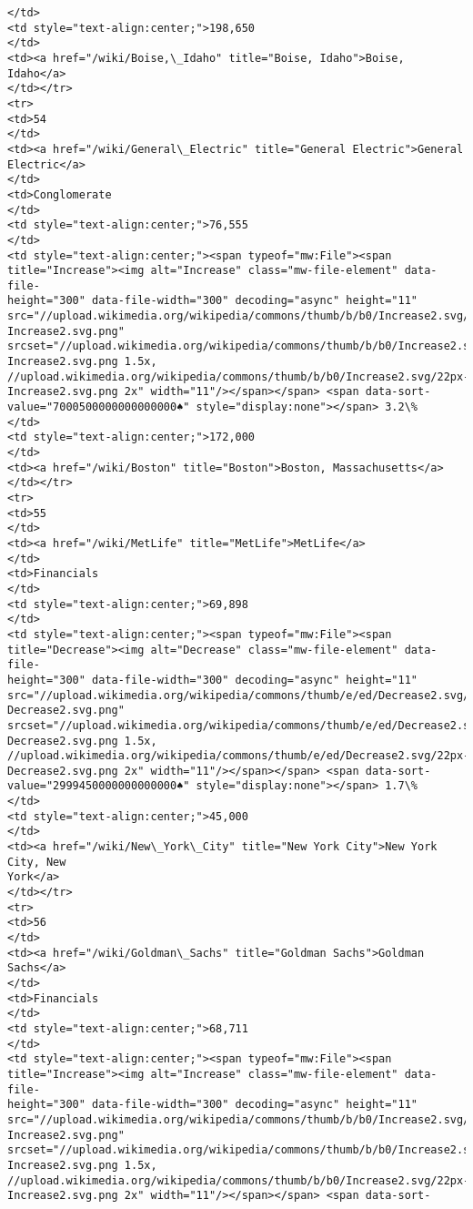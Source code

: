 \documentclass[11pt]{article}
\begin{document}
\begin{Verbatim}[commandchars=\\\{\}]
</td>
<td style="text-align:center;">198,650
</td>
<td><a href="/wiki/Boise,\_Idaho" title="Boise, Idaho">Boise, Idaho</a>
</td></tr>
<tr>
<td>54
</td>
<td><a href="/wiki/General\_Electric" title="General Electric">General
Electric</a>
</td>
<td>Conglomerate
</td>
<td style="text-align:center;">76,555
</td>
<td style="text-align:center;"><span typeof="mw:File"><span
title="Increase"><img alt="Increase" class="mw-file-element" data-file-
height="300" data-file-width="300" decoding="async" height="11"
src="//upload.wikimedia.org/wikipedia/commons/thumb/b/b0/Increase2.svg/11px-
Increase2.svg.png"
srcset="//upload.wikimedia.org/wikipedia/commons/thumb/b/b0/Increase2.svg/17px-
Increase2.svg.png 1.5x,
//upload.wikimedia.org/wikipedia/commons/thumb/b/b0/Increase2.svg/22px-
Increase2.svg.png 2x" width="11"/></span></span> <span data-sort-
value="7000500000000000000♠" style="display:none"></span> 3.2\%
</td>
<td style="text-align:center;">172,000
</td>
<td><a href="/wiki/Boston" title="Boston">Boston, Massachusetts</a>
</td></tr>
<tr>
<td>55
</td>
<td><a href="/wiki/MetLife" title="MetLife">MetLife</a>
</td>
<td>Financials
</td>
<td style="text-align:center;">69,898
</td>
<td style="text-align:center;"><span typeof="mw:File"><span
title="Decrease"><img alt="Decrease" class="mw-file-element" data-file-
height="300" data-file-width="300" decoding="async" height="11"
src="//upload.wikimedia.org/wikipedia/commons/thumb/e/ed/Decrease2.svg/11px-
Decrease2.svg.png"
srcset="//upload.wikimedia.org/wikipedia/commons/thumb/e/ed/Decrease2.svg/17px-
Decrease2.svg.png 1.5x,
//upload.wikimedia.org/wikipedia/commons/thumb/e/ed/Decrease2.svg/22px-
Decrease2.svg.png 2x" width="11"/></span></span> <span data-sort-
value="2999450000000000000♠" style="display:none"></span> 1.7\%
</td>
<td style="text-align:center;">45,000
</td>
<td><a href="/wiki/New\_York\_City" title="New York City">New York City, New
York</a>
</td></tr>
<tr>
<td>56
</td>
<td><a href="/wiki/Goldman\_Sachs" title="Goldman Sachs">Goldman Sachs</a>
</td>
<td>Financials
</td>
<td style="text-align:center;">68,711
</td>
<td style="text-align:center;"><span typeof="mw:File"><span
title="Increase"><img alt="Increase" class="mw-file-element" data-file-
height="300" data-file-width="300" decoding="async" height="11"
src="//upload.wikimedia.org/wikipedia/commons/thumb/b/b0/Increase2.svg/11px-
Increase2.svg.png"
srcset="//upload.wikimedia.org/wikipedia/commons/thumb/b/b0/Increase2.svg/17px-
Increase2.svg.png 1.5x,
//upload.wikimedia.org/wikipedia/commons/thumb/b/b0/Increase2.svg/22px-
Increase2.svg.png 2x" width="11"/></span></span> <span data-sort-

\end{Verbatim}
\end{document}
